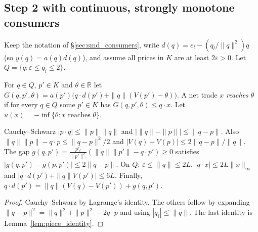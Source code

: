 \subsection{Step 2 with continuous, strongly monotone consumers}
\label{sec:smd_standard}

Keep the notation of \S\ref{sec:smd_consumers}, write $d(q) = e_l - (q_l/\|q\|^2)q$ (so $y(q) = a(q)d(q)$), and assume all
prices in $K$ are at least $2\varepsilon > 0$. Let $Q = \{q : \varepsilon \le q_i \le 2\}$.

\begin{definition}
\label{def:std_utility}
\leanok
{}
For $q \in Q$, $p' \in K$ and $\theta \in \mathbb{R}$ let $G(q,p',\theta) = a(p')\bigl(q\cdot d(p') + \|q\|(V(p') - \theta)\bigr)$.
A net trade $x$ \emph{reaches} $\theta$ if for every $q \in Q$ some $p' \in K$ has $G(q,p',\theta) \le q\cdot x$. Let
$u(x) = -\inf\{\theta : x \text{ reaches } \theta\}$.
\end{definition}

\begin{lemma}
\label{lem:std_estimates}
\leanok
{}
Cauchy--Schwarz $|p\cdot q| \le \|p\|\|q\|$ and $\bigl|\|q\| - \|p\|\bigr| \le \|q - p\|$. Also
$\|q\|\|p\| - q\cdot p \le \|q-p\|^2/2$ and $|V(q) - V(p)| \le 2\|q-p\|/\|q\|$. The gap
$g(q,p') = \frac{p'_l}{\|p'\|^2}(\|q\|\|p'\| - q\cdot p') \ge 0$ satisfies $|g(q,p') - g(p,p')| \le 2\|q - p\|$. On $Q$:
$\varepsilon \le \|q\| \le 2L$, $|q \cdot x| \le 2L\|x\|_\infty$ and $|q\cdot d(p') + \|q\|V(p')| \le 6L$. Finally,
$q \cdot d(p') = \|q\|(V(q) - V(p')) + g(q,p')$.
\end{lemma}
\begin{proof}
\leanok
Cauchy--Schwarz by Lagrange's identity. The others follow by expanding $\|q - p\|^2 = \|q\|^2 + \|p\|^2 - 2q\cdot p$ and using
$|q_i| \le \|q\|$. The last identity is Lemma~\ref{lem:piece_identity}.
\end{proof}

